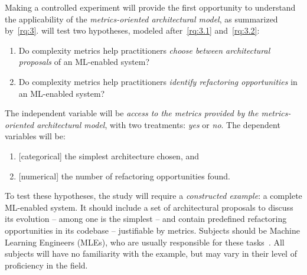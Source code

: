   Making a controlled experiment will provide the first opportunity
  to understand the applicability of the \emph{metrics-oriented
  architectural model}, as summarized by~\cref{rq:3}. 
  will test two hypotheses, modeled after~\cref{rq:3.1} and~\cref{rq:3.2}:
  \begin{enumerate}[label=H\arabic*.]
    \item Do complexity metrics help practitioners \emph{choose between
          architectural proposals} of an ML-enabled system?
          \label{it:ce_hypothesis_1}
    \item Do complexity metrics help practitioners \emph{identify
          refactoring opportunities} in an ML-enabled system?
          \label{it:ce_hypothesis_2}
  \end{enumerate}
  The independent variable will be \emph{access to the metrics provided by
  the metrics-oriented architectural model}, with two treatments: \emph{yes}
  or \emph{no}. The dependent variables will be:
  \begin{enumerate}[label=V\arabic*.]
    \item {[categorical]} the simplest architecture chosen, and
          \label{it:ce_dependent_variables_1}
    \item {[numerical]} the number of refactoring opportunities found.
          \label{it:ce_dependent_variables_2}
  \end{enumerate}

  To test these hypotheses, the study will require a \emph{constructed example}:
  a complete ML-enabled system.
  It should include a set of architectural proposals to discuss its evolution
  -- among one is the simplest -- and contain predefined refactoring
  opportunities in its codebase -- justifiable by metrics.
  Subjects should be Machine Learning Engineers (MLEs), who are
  usually responsible for these tasks~\parencite{Burkov2020MachineEngineering,
  Wilson2022MachineAction}. All subjects will have no familiarity with
  the example, but may vary in their level of proficiency in the field.

